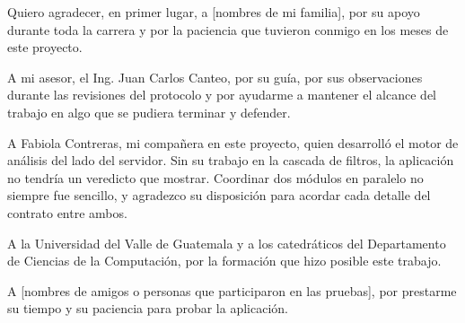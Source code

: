 Quiero agradecer, en primer lugar, a [nombres de mi familia], por su apoyo durante toda la carrera y por la paciencia que tuvieron conmigo en los meses de este proyecto.

A mi asesor, el Ing. Juan Carlos Canteo, por su guía, por sus observaciones durante las revisiones del protocolo y por ayudarme a mantener el alcance del trabajo en algo que se pudiera terminar y defender.

A Fabiola Contreras, mi compañera en este proyecto, quien desarrolló el motor de análisis del lado del servidor. Sin su trabajo en la cascada de filtros, la aplicación no tendría un veredicto que mostrar. Coordinar dos módulos en paralelo no siempre fue sencillo, y agradezco su disposición para acordar cada detalle del contrato entre ambos.

A la Universidad del Valle de Guatemala y a los catedráticos del Departamento de Ciencias de la Computación, por la formación que hizo posible este trabajo.

A [nombres de amigos o personas que participaron en las pruebas], por prestarme su tiempo y su paciencia para probar la aplicación.
